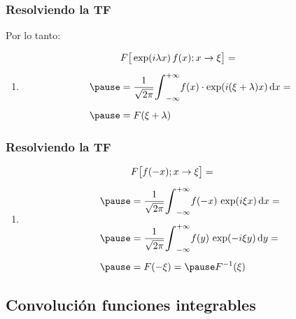 \begin{frame}
\frametitle{Resolviendo la TF}  
Por lo tanto:
\pause
{}
\begin{enumerate}[<+->]
\item
\begin{eqnarray*}
\begin{aligned}
&F \big[ \exp(i \lambda x) \, f (x); x \to \xi \big] = \\[0.5em] \pause
&= \dfrac{1}{\sqrt{2 \pi}} \scaleint{6ex}_{-\infty}^{+\infty} f (x) \cdot \exp(i (\xi + \lambda) x) \dd{x} = \\[0.5em] \pause
&= F (\xi + \lambda)
\end{aligned}
\end{eqnarray*}
\seti
\end{enumerate}
\end{frame}
\begin{frame}
\frametitle{Resolviendo la TF}  
\begin{enumerate}[<+->]
\conti
\item 
\begin{eqnarray*}
\begin{aligned}
&F \big[ f (-x); x \to \xi \big] = \\[0.5em] \pause
&= \dfrac{1}{\sqrt{2 \pi}} \scaleint{6ex}_{-\infty}^{+\infty} f (-x) \, \exp(i \xi x) \dd{x} = \\[0.5em] \pause
&= \dfrac{1}{\sqrt{2 \pi}} \scaleint{6ex}_{-\infty}^{+\infty} f (y) \, \exp(-i \xi y) \dd{y} = \\[0.5em] \pause
&= F (-\xi) = \pause F^{-1} (\xi)
\end{aligned}
\end{eqnarray*}
\end{enumerate}
\end{frame}

\subsection{Convolución funciones integrables}

